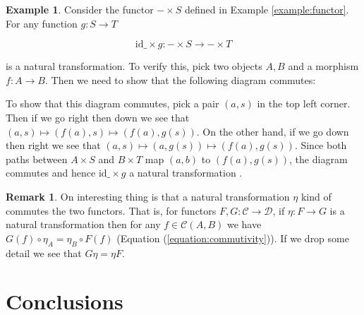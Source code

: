 \documentclass{article}
\theoremstyle{definition}
\newtheorem{example}{Example}[section]
\newtheorem{remark}{Remark}[section]
\begin{document}
\medskip
\noindent
\begin{example}
Consider the functor $- \times S$ defined in Example
\ref{example:functor}. For any function $g : S \to T$

\begin{equation*}
\text{id}\_ \times g : - \times S \to - \times T 
\end{equation*}

\smallskip
\noindent
is a natural transformation. To verify this, pick two objects 
$A,B$ and a morphism $f : A \to B$. Then we need to show 
that the following diagram commutes:

\medskip
%
%
%
\begin{center}
\end{center}

\bigskip
\noindent
To show that this diagram commutes, pick a pair $(a,s)$ in the
top left corner.  Then if we go right then down we see that
$(a,s) \mapsto (f(a),s) \mapsto (f(a),g(s))$.  On the other hand,
if we go down then right we see that $(a,s) \mapsto (a, g(s))
\mapsto (f (a), g(s))$.  Since both paths between $A \times S$
and $B \times T$ map $(a,b)$ to $(f(a),g(s))$, the diagram
commutes and hence $\text{id}\_ \times g$ a natural
transformation \cite{intro_category_theory_notes}.
\end{example}

\begin{remark}
On interesting thing is that a natural transformation $\eta$ 
kind of commutes the two functors. That is, for functors 
$F,G: \mathcal{C} \to \mathcal{D}$, if $\eta : F \to G$ is a 
natural transformation then for any $f \in \mathcal{C}(A,B)$ 
we have $G(f) \circ \eta_{A} = \eta_{B} \circ F(f)$ 
(Equation (\ref{equation:commutivity})). If we drop some detail 
we see that $G \eta = \eta F$.
\label{remark:natural_transformation_commutes}
\end{remark}
%
%
%
\section{Conclusions}
\label{section:conclusions}
%
%
%
\end{document}
